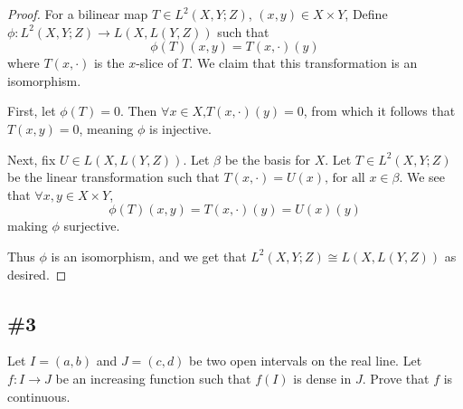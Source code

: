 \documentclass{article}
\theoremstyle{plain} %
\numberwithin{thm}{section} %
\theoremstyle{definition}
\begin{document}
   \begin{proof}
        For a bilinear map \(T \in L^2(X,Y;Z)\), \((x,y) \in X \times Y\), Define \(\phi : L^2(X,Y;Z) \to L(X,L(Y,Z))\) such that
        \[
            \phi (T)(x,y) = T(x, \cdot)(y)
        \]  
        where \(T(x,\cdot)\) is the \(x\)-slice of \(T\). We claim that this transformation is an isomorphism.

        First, let \(\phi (T) = 0\). Then \(\forall x \in X \text{,} T(x, \cdot)(y) = 0\), from which it follows that \(T(x, y) = 0\), meaning \(\phi\) is injective. 
        
        Next, fix \(U \in L(X,L(Y,Z))\). Let \(\beta \) be the basis for \(X\). Let \(T \in L^2(X,Y;Z)\) be the linear transformation such that \(T(x, \cdot) = U(x) \text{, for all } x \in \beta \). We see that \(\forall x,y \in X \times Y\),
        \[
            \phi (T)(x,y) = T(x, \cdot)(y) = U(x)(y)
        \]
        making \(\phi \) surjective.

        Thus \(\phi \) is an isomorphism, and we get that \(L^2(X,Y;Z) \cong L(X,L(Y,Z))\) as desired.
   \end{proof}

   \subsection{\#3}

   Let $I=(a,b)$ and $J=(c,d)$ be two open intervals on the real line. Let $f:I\rightarrow J$ be an increasing function such that $f(I)$ is dense in $J$. Prove that $f$ is continuous.
\end{document}
